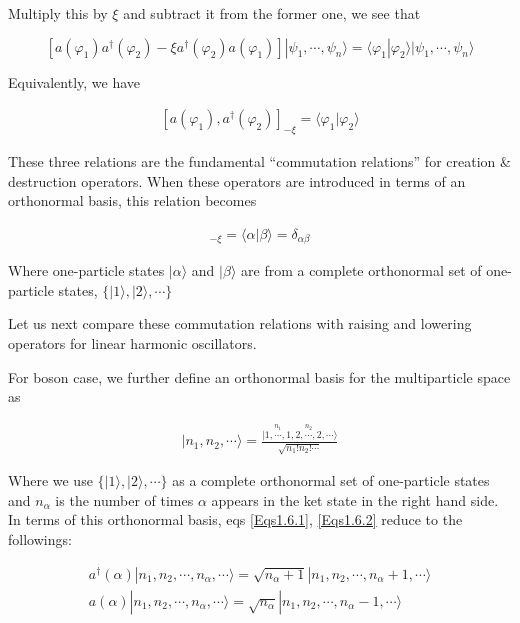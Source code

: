 Multiply this by $\xi$ and subtract it from the former one, we see that

\[[a(\varphi_1)a^\dagger(\varphi_2) - \xi a^\dagger(\varphi_2)a(\varphi_1)]|\psi_1,\cdots,\psi_n\rangle = \langle \varphi_1|\varphi_2\rangle |\psi_1,\cdots,\psi_n\rangle \]

Equivalently, we have

\begin{align}\label{eqs1.6.5}
[a(\varphi_1),a^\dagger(\varphi_2)] _{-\xi} = \langle\varphi_1|\varphi_2\rangle
\end{align}

These three relations are the fundamental ``commutation relations'' for creation \& destruction operators. When these operators are introduced in terms of an orthonormal basis, this relation becomes

\begin{align}
[a(\alpha),a^\dagger(\beta)]_{-\xi} = \langle\alpha|\beta\rangle = \delta_{\alpha\beta}
\end{align}

Where one-particle states $|\alpha\rangle$ and $|\beta\rangle$ are from a complete orthonormal set of one-particle states, $\{|1\rangle,|2\rangle,\cdots\}$

Let us next compare these commutation relations with raising and lowering operators for linear harmonic oscillators. 

For boson case, we further define an orthonormal basis for the multiparticle space as 

\begin{align}|n_1,n_2,\cdots\rangle = \frac{|\overset{n_1}{1,\cdots,1},\overset{n_2}{2,\cdots,2},\cdots\rangle}{\sqrt{n_1! n_2!\cdots}} \end{align}

Where we use $\{|1\rangle,|2\rangle,\cdots\}$ as a complete orthonormal set of one-particle states and $n_{\alpha}$ is the number of times $\alpha$ appears in the ket state in the right hand side. In terms of this orthonormal basis, eqs \eqref{Eqs1.6.1}, \eqref{Eqs1.6.2} reduce to the followings:

\begin{align}
a^\dagger(\alpha)|n_1,n_2,\cdots,n_{\alpha},\cdots\rangle = \sqrt{n_\alpha+1}|n_1,n_2,\cdots,n_{\alpha}+1,\cdots\rangle\\
a(\alpha)|n_1,n_2,\cdots,n_{\alpha},\cdots\rangle = \sqrt{n_\alpha}|n_1,n_2,\cdots,n_{\alpha}-1,\cdots\rangle
\end{align}

